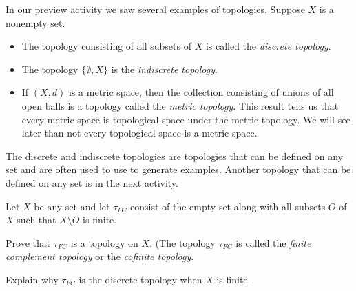 
In our preview activity we saw several examples of topologies. Suppose $X$ is a nonempty set.
\begin{itemize}
\item The topology consisting of all subsets of $X$ is called the \emph{discrete topology}.
\item The topology $\{\emptyset, X\}$ is the \emph{indiscrete topology}. 
\item If $(X,d)$ is a metric space, then the collection consisting of unions of all open balls is a topology called the \emph{metric topology}. This result tells us that every metric space is topological space under the metric topology. We will see later than not every topological space is a metric space. 
\end{itemize}
The discrete and indiscrete topologies are topologies that can be defined on any set and are often used to use to generate examples. Another topology that can be defined on any set is in the next activity. 

\begin{activity} \label{act:TS_limits} Let $X$ be any set and let $\tau_{FC}$ consist of the empty set along with all subsets $O$ of $X$ such that $X \setminus O$ is finite. 
\ba
\item Prove that $\tau_{FC}$ is a topology on $X$. (The topology $\tau_{FC}$ is called the \emph{finite complement topology} or the \emph{cofinite topology}. 

\item Explain why $\tau_{FC}$ is the discrete topology when $X$ is finite.

\ea

\end{activity}

